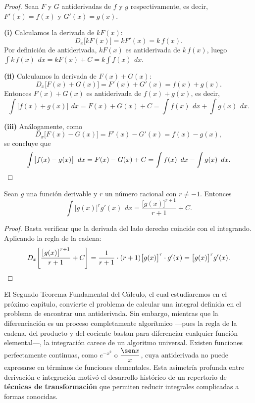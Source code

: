 \begin{proof}
Sean $F$ y $G$ antiderivadas de $f$ y $g$ respectivamente, es decir,
$F'(x)=f(x)$ y $G'(x)=g(x)$.

\textbf{(i)} Calculamos la derivada de $kF(x)$:
\[
  D_{x}\bigl[kF(x)\bigr] = kF'(x) = k\,f(x).
\]
Por definición de antiderivada, $kF(x)$ es antiderivada de $k\,f(x)$, luego
$\int k\,f(x)\,\ dx = kF(x)+C = k\int f(x)\,\ dx$.

\textbf{(ii)} Calculamos la derivada de $F(x)+G(x)$:
\[
  D_{x}\bigl[F(x)+G(x)\bigr] = F'(x)+G'(x) = f(x)+g(x).
\]
Entonces $F(x)+G(x)$ es antiderivada de $f(x)+g(x)$, es decir,
\[
  \int \bigl[f(x)+g(x)\bigr]\,\ dx = F(x)+G(x)+C
  = \int f(x)\,\ dx + \int g(x)\,\ dx.
\]

\textbf{(iii)} Análogamente, como
\[
  D_{x}\bigl[F(x)-G(x)\bigr] = F'(x)-G'(x) = f(x)-g(x),
\]
se concluye que
\[
  \int \bigl[f(x)-g(x)\bigr]\,\ dx = F(x)-G(x)+C
  = \int f(x)\,\ dx - \int g(x)\,\ dx. \qedhere
\]
\end{proof}

\begin{theorem}
\label{teo:potencia-generalizada}
Sean $g$ una función derivable y $r$ un número racional con $r\neq -1$.
Entonces
\[
  \int \bigl[g(x)\bigr]^{r}g'(x)\,\ dx
  = \frac{\bigl[g(x)\bigr]^{r+1}}{r+1} + C.
\]
\end{theorem}

\begin{proof}
Basta verificar que la derivada del lado derecho coincide con el integrando.
Aplicando la regla de la cadena:
\[
  D_{x}\!\left[\frac{\bigl[g(x)\bigr]^{r+1}}{r+1}+C\right]
  = \frac{1}{r+1}\cdot(r+1)\bigl[g(x)\bigr]^{r}\cdot g'(x)
  = \bigl[g(x)\bigr]^{r}g'(x). \qedhere
\]
\end{proof}

El Segundo Teorema Fundamental del Cálculo, el cual estudiaremos en el
próximo capítulo, convierte el problema de calcular una integral definida en
el problema de encontrar una antiderivada. Sin embargo, mientras que la
diferenciación es un proceso completamente algorítmico —pues la regla de la
cadena, del producto y del cociente bastan para diferenciar cualquier función
elemental—, la integración carece de un algoritmo universal. Existen
funciones perfectamente continuas, como $e^{-x^{2}}$ o $\dfrac{\sen x}{x}$,
cuya antiderivada no puede expresarse en términos de funciones elementales.
Esta asimetría profunda entre derivación e integración motivó el desarrollo
histórico de un repertorio de \textbf{técnicas de transformación} que
permiten reducir integrales complicadas a formas conocidas.

